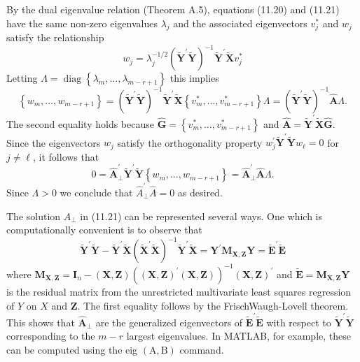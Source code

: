 \documentclass[10pt]{article}
\begin{document}
By the dual eigenvalue relation (Theorem A.5), equations (11.20) and (11.21) have the same non-zero eigenvalues $\lambda_{j}$ and the associated eigenvectors $v_{j}^{*}$ and $w_{j}$ satisfy the relationship
$$
w_{j}=\lambda_{j}^{-1 / 2}\left(\tilde{\boldsymbol{Y}}^{\prime} \tilde{\boldsymbol{Y}}\right)^{-1} \tilde{\boldsymbol{Y}}^{\prime} \widetilde{\boldsymbol{X}} v_{j}^{*}
$$
Letting $\Lambda=\operatorname{diag}\left\{\lambda_{m}, \ldots, \lambda_{m-r+1}\right\}$ this implies
$$
\left\{w_{m}, \ldots, w_{m-r+1}\right\}=\left(\widetilde{\boldsymbol{Y}}^{\prime} \widetilde{\boldsymbol{Y}}\right)^{-1} \tilde{\boldsymbol{Y}}^{\prime} \widetilde{\boldsymbol{X}}\left\{v_{m}^{*}, \ldots, v_{m-r+1}^{*}\right\} \Lambda=\left(\tilde{\boldsymbol{Y}}^{\prime} \widetilde{\boldsymbol{Y}}\right)^{-1} \widehat{\boldsymbol{A}} \Lambda .
$$
The second equality holds because $\widehat{\boldsymbol{G}}=\left\{v_{m}^{*}, \ldots, v_{m-r+1}^{*}\right\}$ and $\widehat{\boldsymbol{A}}=\widetilde{\boldsymbol{Y}}^{\prime} \widetilde{\boldsymbol{X}} \widehat{\boldsymbol{G}}$. Since the eigenvectors $w_{j}$ satisfy the orthogonality property $w_{j}^{\prime} \widetilde{\boldsymbol{Y}}^{\prime} \widetilde{\boldsymbol{Y}} w_{\ell}=0$ for $j \neq \ell$, it follows that
$$
0=\widehat{\boldsymbol{A}}_{\perp}^{\prime} \tilde{\boldsymbol{Y}}^{\prime} \tilde{\boldsymbol{Y}}\left\{w_{m}, \ldots, w_{m-r+1}\right\}=\widehat{\boldsymbol{A}}_{\perp}^{\prime} \widehat{\boldsymbol{A}} \Lambda .
$$
Since $\Lambda>0$ we conclude that $\widehat{A}_{\perp}^{\prime} \widehat{A}=0$ as desired.

The solution $\widehat{A}_{\perp}$ in (11.21) can be represented several ways. One which is computationally convenient is to observe that
$$
\tilde{\boldsymbol{Y}}^{\prime} \widetilde{\boldsymbol{Y}}-\widetilde{\boldsymbol{Y}}^{\prime} \widetilde{\boldsymbol{X}}\left(\widetilde{\boldsymbol{X}}^{\prime} \widetilde{\boldsymbol{X}}\right)^{-1} \widetilde{\boldsymbol{Y}}^{\prime} \widetilde{\boldsymbol{X}}=\boldsymbol{Y}^{\prime} \boldsymbol{M}_{\boldsymbol{X}, \boldsymbol{Z}} \boldsymbol{Y}=\widetilde{\boldsymbol{E}}^{\prime} \widetilde{\boldsymbol{E}}
$$
where $\boldsymbol{M}_{\boldsymbol{X}, \boldsymbol{Z}}=\boldsymbol{I}_{n}-(\boldsymbol{X}, \boldsymbol{Z})\left((\boldsymbol{X}, \boldsymbol{Z})^{\prime}(\boldsymbol{X}, \boldsymbol{Z})\right)^{-1}(\boldsymbol{X}, \boldsymbol{Z})^{\prime}$ and $\widetilde{\boldsymbol{E}}=\boldsymbol{M}_{\boldsymbol{X}, \boldsymbol{Z}} \boldsymbol{Y}$ is the residual matrix from the unrestricted multivariate least squares regression of $Y$ on $X$ and $\boldsymbol{Z}$. The first equality follows by the FrischWaugh-Lovell theorem. This shows that $\widehat{\boldsymbol{A}}_{\perp}$ are the generalized eigenvectors of $\widetilde{\boldsymbol{E}}^{\prime} \widetilde{\boldsymbol{E}}$ with respect to $\widetilde{\boldsymbol{Y}}^{\prime} \tilde{\boldsymbol{Y}}$ corresponding to the $m-r$ largest eigenvalues. In MATLAB, for example, these can be computed using the eig $(\mathrm{A}, \mathrm{B})$ command.
\end{document}
